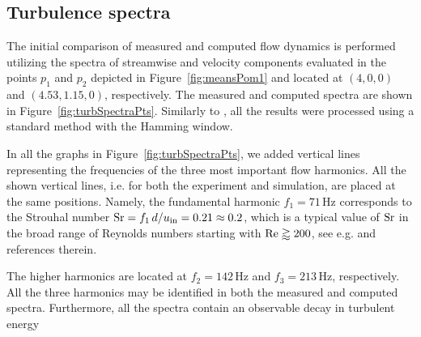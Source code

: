 \subsection{Turbulence spectra}
\label{sub:turbSpectra}

The initial comparison of measured and computed flow dynamics is performed utilizing the spectra of streamwise and  velocity components evaluated in the points $p_{1}$ and $p_{2}$ depicted in Figure~\ref{fig:meansPom1} and located at $(4,0,0)$ and $(4.53,1.15,0)$, respectively. The measured and computed spectra are shown in Figure~\ref{fig:turbSpectraPts}. Similarly to \citep{uruba2020a}, all the results were processed using {a} standard method with the Hamming window.

In all the graphs in Figure~\ref{fig:turbSpectraPts}, we added vertical lines representing the frequencies of the three most important {flow} harmonics. All the shown vertical lines, i.e. for both the experiment and simulation, are placed at the same positions. Namely, the fundamental harmonic $f_{1} = 71\,\mathrm{Hz}$ corresponds to the Strouhal number $\mathrm{Sr} = f_{1}\,d/u_{\mathrm{in}} = 0.21\approx 0.2$, which is a typical value of $\mathrm{Sr}$ in the broad range of Reynolds numbers starting with $\mathrm{Re} \gtrapprox 200$, see e.g. \citep{lienhard1966} and references therein.

The higher harmonics are located at $f_{2} = 142\,\mathrm{Hz}$ and $f_{3} = 213\,\mathrm{Hz}$, respectively. All the three harmonics may be identified in both the measured and computed spectra. Furthermore, all the spectra contain an observable decay in turbulent energy 


